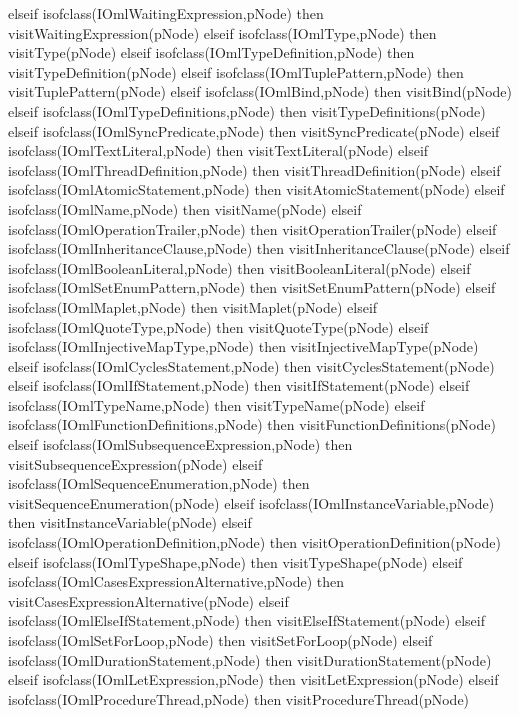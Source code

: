\begin{vdm_al}
      elseif isofclass(IOmlWaitingExpression,pNode) then visitWaitingExpression(pNode)
      elseif isofclass(IOmlType,pNode) then visitType(pNode)
      elseif isofclass(IOmlTypeDefinition,pNode) then visitTypeDefinition(pNode)
      elseif isofclass(IOmlTuplePattern,pNode) then visitTuplePattern(pNode)
      elseif isofclass(IOmlBind,pNode) then visitBind(pNode)
      elseif isofclass(IOmlTypeDefinitions,pNode) then visitTypeDefinitions(pNode)
      elseif isofclass(IOmlSyncPredicate,pNode) then visitSyncPredicate(pNode)
      elseif isofclass(IOmlTextLiteral,pNode) then visitTextLiteral(pNode)
      elseif isofclass(IOmlThreadDefinition,pNode) then visitThreadDefinition(pNode)
      elseif isofclass(IOmlAtomicStatement,pNode) then visitAtomicStatement(pNode)
      elseif isofclass(IOmlName,pNode) then visitName(pNode)
      elseif isofclass(IOmlOperationTrailer,pNode) then visitOperationTrailer(pNode)
      elseif isofclass(IOmlInheritanceClause,pNode) then visitInheritanceClause(pNode)
      elseif isofclass(IOmlBooleanLiteral,pNode) then visitBooleanLiteral(pNode)
      elseif isofclass(IOmlSetEnumPattern,pNode) then visitSetEnumPattern(pNode)
      elseif isofclass(IOmlMaplet,pNode) then visitMaplet(pNode)
      elseif isofclass(IOmlQuoteType,pNode) then visitQuoteType(pNode)
      elseif isofclass(IOmlInjectiveMapType,pNode) then visitInjectiveMapType(pNode)
      elseif isofclass(IOmlCyclesStatement,pNode) then visitCyclesStatement(pNode)
      elseif isofclass(IOmlIfStatement,pNode) then visitIfStatement(pNode)
      elseif isofclass(IOmlTypeName,pNode) then visitTypeName(pNode)
      elseif isofclass(IOmlFunctionDefinitions,pNode) then visitFunctionDefinitions(pNode)
      elseif isofclass(IOmlSubsequenceExpression,pNode) then visitSubsequenceExpression(pNode)
      elseif isofclass(IOmlSequenceEnumeration,pNode) then visitSequenceEnumeration(pNode)
      elseif isofclass(IOmlInstanceVariable,pNode) then visitInstanceVariable(pNode)
      elseif isofclass(IOmlOperationDefinition,pNode) then visitOperationDefinition(pNode)
      elseif isofclass(IOmlTypeShape,pNode) then visitTypeShape(pNode)
      elseif isofclass(IOmlCasesExpressionAlternative,pNode) then visitCasesExpressionAlternative(pNode)
      elseif isofclass(IOmlElseIfStatement,pNode) then visitElseIfStatement(pNode)
      elseif isofclass(IOmlSetForLoop,pNode) then visitSetForLoop(pNode)
      elseif isofclass(IOmlDurationStatement,pNode) then visitDurationStatement(pNode)
      elseif isofclass(IOmlLetExpression,pNode) then visitLetExpression(pNode)
      elseif isofclass(IOmlProcedureThread,pNode) then visitProcedureThread(pNode)

\end{vdm_al}
